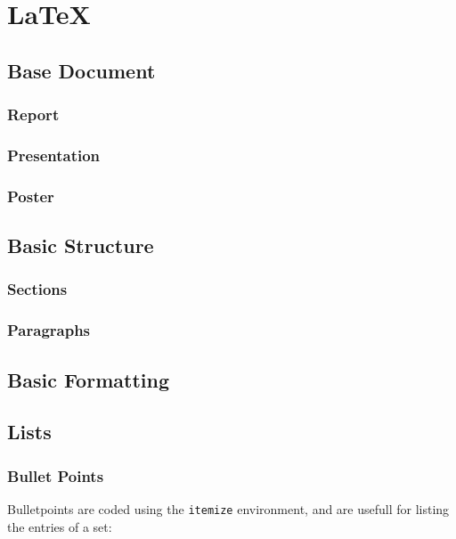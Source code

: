\chapter{\LaTeX}
\label{latex}

\section{Base Document}

\subsection{Report}
\subsection{Presentation}
\subsection{Poster}

\section{Basic Structure}
\subsection{Sections}
\subsection{Paragraphs}

\section{Basic Formatting}

\section{Lists}
\subsection{Bullet Points}

Bulletpoints are coded using the \texttt{itemize} environment, and are usefull for listing the entries of a set:

